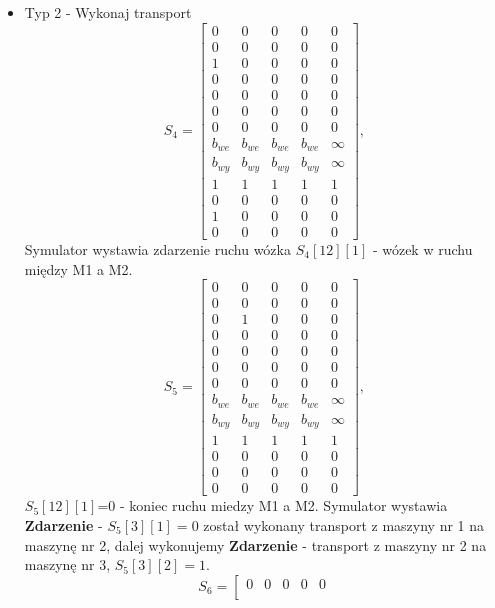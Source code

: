 \documentclass[10pt, a4paper]{article}
\begin{document}
\begin{itemize}
\item Typ 2 - Wykonaj transport
\begin{equation*}
S_4=\left[\begin{array}{ccccc}
0 & 0 & 0 & 0& 0\\
0 & 0 & 0 & 0 & 0\\
1 & 0 & 0 & 0& 0\\
0 & 0 & 0 & 0& 0\\
0 & 0 & 0 & 0& 0\\
0 & 0 & 0 & 0 & 0\\
0 & 0 & 0 & 0& 0\\
b_{we}& b_{we}& b_{we}& b_{we} & \infty\\
b_{wy}& b_{wy}& b_{wy}& b_{wy} & \infty\\
1& 1& 1& 1 & 1\\
0 & 0 & 0 & 0 & 0\\
1 & 0 & 0 & 0 & 0\\
0 & 0 & 0 & 0 & 0
\end{array}\right],
\end{equation*}
Symulator wystawia zdarzenie ruchu wózka $S_4[12][1]$ - wózek w ruchu między M1 a M2.
\begin{equation*}
S_5=\left[\begin{array}{ccccc}
0 & 0 & 0 & 0& 0\\
0 & 0 & 0 & 0 & 0\\
0 & 1 & 0 & 0& 0\\
0 & 0 & 0 & 0& 0\\
0 & 0 & 0 & 0& 0\\
0 & 0 & 0 & 0 & 0\\
0 & 0 & 0 & 0& 0\\
b_{we}& b_{we}& b_{we}& b_{we} & \infty\\
b_{wy}& b_{wy}& b_{wy}& b_{wy} & \infty\\
1& 1& 1& 1 & 1\\
0 & 0 & 0 & 0 & 0\\
0 & 0 & 0 & 0 & 0\\
0 & 0 & 0 & 0 & 0
\end{array}\right],
\end{equation*}
$S_5[12][1]$=0 - koniec ruchu miedzy M1 a M2. Symulator wystawia \textbf{Zdarzenie} - $S_5[3][1]=0$ został wykonany transport z maszyny nr 1 na maszynę nr 2, dalej wykonujemy \textbf{Zdarzenie} - transport z maszyny nr 2 na maszynę nr 3, $S_5[3][2]=1$.
\begin{equation*}
S_6=\left[\begin{array}{ccccc}
0 & 0 & 0 & 0&0\\

\end{array}
\end{equation*}
\end{itemize}
\end{document}

